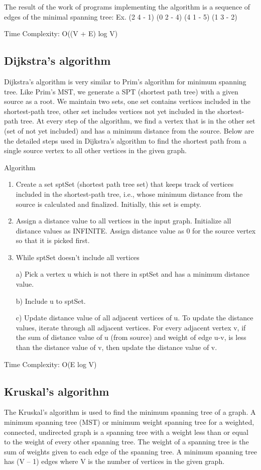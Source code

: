 \documentclass[12pt]{book}
\begin{document}
The result of the work of programs implementing the algorithm is a sequence of edges of the minimal spanning tree:
Ex. (2 4 - 1) (0 2 - 4) (4 1 - 5) (1 3 - 2)  

Time Complexity: O((V + E) log V)

\subsection{Dijkstra's algorithm}
Dijkstra’s algorithm is very similar to Prim’s algorithm for minimum spanning tree. Like Prim’s MST, we generate a SPT (shortest path tree) with a given source as a root. We maintain two sets, one set contains vertices included in the shortest-path tree, other set includes vertices not yet included in the shortest-path tree. At every step of the algorithm, we find a vertex that is in the other set (set of not yet included) and has a minimum distance from the source.
Below are the detailed steps used in Dijkstra’s algorithm to find the shortest path from a single source vertex to all other vertices in the given graph. 

Algorithm
\begin{enumerate}
    \item Create a set sptSet (shortest path tree set) that keeps track of vertices included in the shortest-path tree, i.e., whose minimum distance from the source is calculated and finalized. Initially, this set is empty. 
    \item Assign a distance value to all vertices in the input graph. Initialize all distance values as INFINITE. Assign distance value as 0 for the source vertex so that it is picked first. 
    \item While sptSet doesn’t include all vertices 
    
a) Pick a vertex u which is not there in sptSet and has a minimum distance value. 

b) Include u to sptSet. 

c) Update distance value of all adjacent vertices of u. To update the distance values, iterate through all adjacent vertices. For every adjacent vertex v, if the sum of distance value of u (from source) and weight of edge u-v, is less than the distance value of v, then update the distance value of v. 
\end{enumerate}

Time Complexity: O(E log V)

\subsection{Kruskal's algorithm}
The Kruskal's algorithm is used to find the minimum spanning tree of a graph. A minimum spanning tree (MST) or minimum weight spanning tree for a weighted, connected, undirected graph is a spanning tree with a weight less than or equal to the weight of every other spanning tree. The weight of a spanning tree is the sum of weights given to each edge of the spanning tree. A minimum spanning tree has (V – 1) edges where V is the number of vertices in the given graph.
\end{document}
